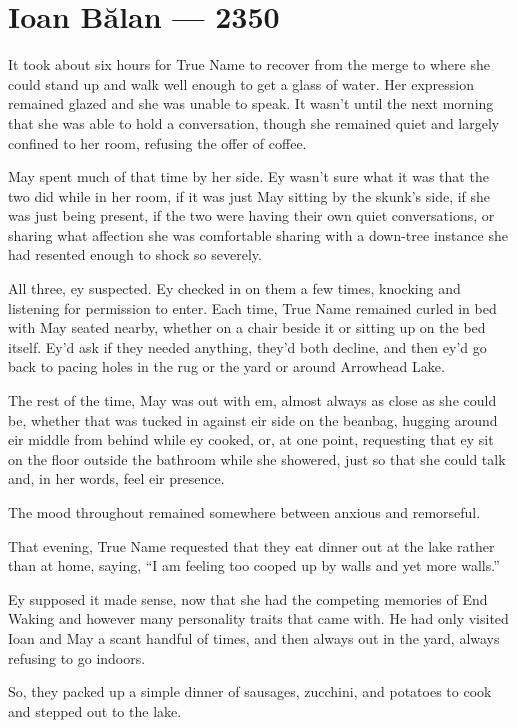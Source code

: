 \hypertarget{ioan-bux103lan-2350}{%
\chapter{Ioan Bălan — 2350}\label{ioan-bux103lan-2350}}

It took about six hours for True Name to recover from the merge to where she could stand up and walk well enough to get a glass of water. Her expression remained glazed and she was unable to speak. It wasn't until the next morning that she was able to hold a conversation, though she remained quiet and largely confined to her room, refusing the offer of coffee.

May spent much of that time by her side. Ey wasn't sure what it was that the two did while in her room, if it was just May sitting by the skunk's side, if she was just being present, if the two were having their own quiet conversations, or sharing what affection she was comfortable sharing with a down-tree instance she had resented enough to shock so severely.

All three, ey suspected. Ey checked in on them a few times, knocking and listening for permission to enter. Each time, True Name remained curled in bed with May seated nearby, whether on a chair beside it or sitting up on the bed itself. Ey'd ask if they needed anything, they'd both decline, and then ey'd go back to pacing holes in the rug or the yard or around Arrowhead Lake.

The rest of the time, May was out with em, almost always as close as she could be, whether that was tucked in against eir side on the beanbag, hugging around eir middle from behind while ey cooked, or, at one point, requesting that ey sit on the floor outside the bathroom while she showered, just so that she could talk and, in her words, feel eir presence.

The mood throughout remained somewhere between anxious and remorseful.

That evening, True Name requested that they eat dinner out at the lake rather than at home, saying, ``I am feeling too cooped up by walls and yet more walls.''

Ey supposed it made sense, now that she had the competing memories of End Waking and however many personality traits that came with. He had only visited Ioan and May a scant handful of times, and then always out in the yard, always refusing to go indoors.

So, they packed up a simple dinner of sausages, zucchini, and potatoes to cook and stepped out to the lake.

